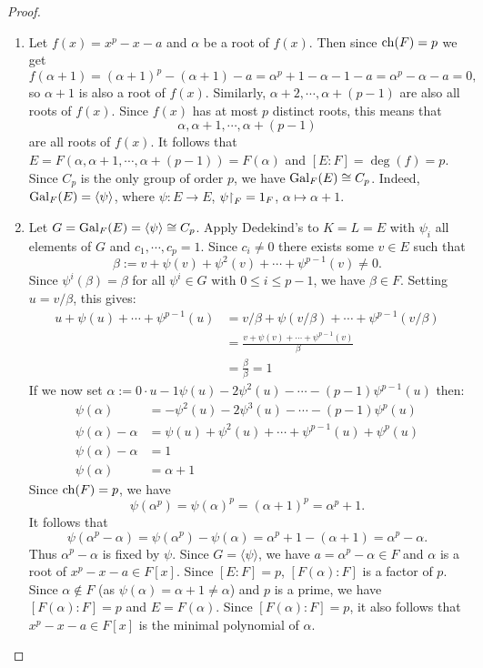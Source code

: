 \documentclass[11pt]{article}
\begin{document}
\begin{proof}\,
    \begin{enumerate}
        \item Let $f(x)=x^p-x-a$ and $\alpha$ be a root of $f(x)$. Then since $\operatorname{ch}(F)=p$ we get
        \[f(\alpha+1)=(\alpha+1)^p-(\alpha+1)-a=\alpha^p+1-\alpha-1-a=\alpha^p-\alpha-a=0,\]
        so $\alpha+1$ is also a root of $f(x)$. Similarly, $\alpha+2,\cdots,\alpha+(p-1)$ are also all roots of $f(x)$. Since $f(x)$ has at most $p$ distinct roots, this means that
        \[\alpha,\alpha+1,\cdots,\alpha+(p-1)\]
        are all roots of $f(x)$. It follows that $E=F(\alpha,\alpha+1,\cdots,\alpha+(p-1))=F(\alpha)$ and $[E:F]=\deg(f)=p$. Since $C_p$ is the only group of order $p$, we have $\operatorname{Gal}_F(E)\cong C_p$. Indeed, $\operatorname{Gal}_F(E)=\langle\psi\rangle$, where $\psi:E\to E$, $\psi{\upharpoonright}_F=1_F$, $\alpha\mapsto\alpha+1$.

        \item Let $G=\operatorname{Gal}_F(E)=\langle\psi\rangle\cong C_p$. Apply Dedekind's  to $K=L=E$ with $\psi_i$ all elements of $G$ and $c_1,\cdots,c_p=1$. Since $c_i\neq0$ there exists some $v\in E$ such that
        \[\beta:=v+\psi(v)+\psi^2(v)+\cdots+\psi^{p-1}(v)\neq0.\]
        Since $\psi^i(\beta)=\beta$ for all $\psi^i\in G$ with $0\leq i\leq p-1$, we have $\beta\in F$. Setting $u=v/\beta$, this gives:
        \begin{align*}
            u+\psi(u)+\cdots+\psi^{p-1}(u)&=v/\beta+\psi(v/\beta)+\cdots+\psi^{p-1}(v/\beta) \\
            &=\frac{v+\psi(v)+\cdots+\psi^{p-1}(v)}{\beta} \\
            &=\frac{\beta}{\beta}=1
        \end{align*}
        If we now set $\alpha:=0\cdot u-1\psi(u)-2\psi^2(u)-\cdots-(p-1)\psi^{p-1}(u)$ then:
        \begin{align*}
            \psi(\alpha)&=-\psi^2(u)-2\psi^3(u)-\cdots-(p-1)\psi^p(u) \\
            \psi(\alpha)-\alpha&=\psi(u)+\psi^2(u)+\cdots+\psi^{p-1}(u)+\psi^p(u) \\
            \psi(\alpha)-\alpha&=1 \\
            \psi(\alpha)&=\alpha+1
        \end{align*}
        Since $\operatorname{ch}(F)=p$, we have
        \[\psi(\alpha^p)=\psi(\alpha)^p=(\alpha+1)^p=\alpha^p+1.\]
        It follows that
        \[\psi(\alpha^p-\alpha)=\psi(\alpha^p)-\psi(\alpha)=\alpha^p+1-(\alpha+1)=\alpha^p-\alpha.\]
        Thus $\alpha^p-\alpha$ is fixed by $\psi$. Since $G=\langle\psi\rangle$, we have $a=\alpha^p-\alpha\in F$ and $\alpha$ is a root of $x^p-x-a\in F[x]$. Since $[E:F]=p$, $[F(\alpha):F]$ is a factor of $p$. Since $\alpha\not\in F$ (as $\psi(\alpha)=\alpha+1\neq\alpha$) and $p$ is a prime, we have $[F(\alpha):F]=p$ and $E=F(\alpha)$. Since $[F(\alpha):F]=p$, it also follows that $x^p-x-a\in F[x]$ is the minimal polynomial of $\alpha$.
    \end{enumerate}
\end{proof}
\end{document}
